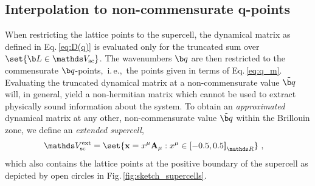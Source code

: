 \subsection{Interpolation to non-commensurate q-points}
When restricting the lattice points to the supercell, the dynamical matrix as defined in Eq.\,\eqref{eq:D(q)} is evaluated only for the truncated sum over $\set{\b L \in \mathds V_{\rm sc}}$. The wavenumbers $\b q$ are then restricted to the commensurate $\b q$-points,~i.\,e.,~the points given in terms of Eq.\,\eqref{eq:q_m}. Evaluating the truncated dynamical matrix at a non-commensurate value $\tilde{\b q}$ will, in general, yield a non-hermitian matrix which cannot be used to extract physically sound information about the system. To obtain an \emph{approximated} dynamical matrix at any other, non-commensurate value $\tilde{\b q}$ within the Brillouin zone, we define an \emph{extended supercell}, 
\begin{align}
	\mathds V_{\rm sc}^{\rm ext}
		&= \set{{\bf x} = x^\mu {\bf A}_\mu : x^\mu \in {[-0.5, 0.5 \boldsymbol{]}_{\mathds R}}}~,
	\label{eq:supercell.extended}
\end{align}
which also contains the lattice points at the positive boundary of the supercell as depicted by open circles in Fig.\,\ref{fig:sketch_supercells}.
